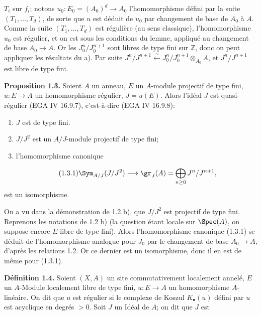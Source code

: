 $T_i$ sur $f_i$; notons $u_0:E_0=(A_0)^d\longrightarrow A_0$ l'homomorphisme défini par la suite $(T_1,\ldots,T_d)$, de sorte que $u$ est déduit de $u_0$ par changement de base de $A_0$ à $A$. Comme la suite $(T_1,\ldots,T_d)$ est régulière (au sens classique), l'homomorphisme $u_0$ est régulier, et on est sous les conditions du lemme, appliqué au changement de base $A_0\longrightarrow A$. Or les $J_0^n/J_0^{n+1}$ sont libres de type fini sur $\mathbb Z$, donc on peut appliquer les résultats du a). Par suite $J^n/J^{n+1}\xleftarrow{\sim}J_0^n/J_0^{n+1}\otimes_{A_0}A$, et $J^n/J^{n+1}$ est libre de type fini.

\textbf{Proposition 1.3.} Soient $A$ un anneau, $E$ un $A$-module projectif de type fini, $u:E\longrightarrow A$ un homomorphisme régulier, $J=u(E)$. Alors l'idéal $J$ est quasi-régulier (EGA IV 16.9.7), c'est-à-dire (EGA IV 16.9.8):
\begin{enumerate}[label=\roman*)]
\item $J$ est de type fini.
\item $J/J^2$ est un $A/J$-module projectif de type fini;
\item l'homomorphisme canonique
\end{enumerate}
\begin{equation}\tag{1.3.1}
 \Sym_{A/J}(J/J^2)\longrightarrow \gr_J(A)=\bigoplus_{n\geq0}J^n/J^{n+1},
\end{equation}
est un isomorphisme.

On a vu dans la démonstration de 1.2 b), que $J/J^2$ est projectif de type fini. Reprenons les notations de 1.2 b) (la question étant locale sur $\Spec(A)$, on suppose encore $E$ libre de type fini). Alors l'homomorphisme canonique (1.3.1) se déduit de l'homomorphisme analogue pour $J_0$ par le changement de base $A_0\longrightarrow A$, d'après les relations 1.2. Or ce dernier est un isomorphisme, donc il en est de même pour (1.3.1).

\textbf{Définition 1.4.} Soient $(X,A)$ un site commutativement localement annelé, $E$ un $A$-Module localement libre de type fini, $u:E\longrightarrow A$ un homomorphisme $A$-linéaire. On dit que $u$ est régulier si le complexe de Koszul $K_\bullet(u)$ défini par $u$ est acyclique en degrés $>0$. Soit $J$ un Idéal de $A$; on dit que $J$ est
